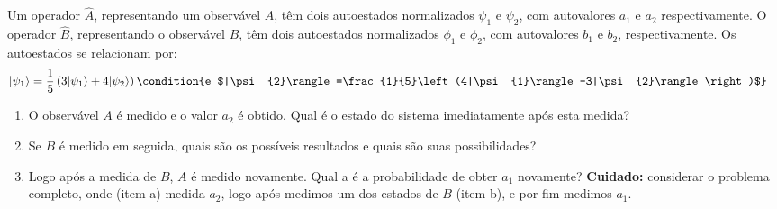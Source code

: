	\begin{prob}
		Um operador $\hat{A}$, representando um observável $A$, têm dois autoestados normalizados $\psi_{1}$ e $\psi_{2}$, com autovalores $a_{1}$ e $a_{2}$ respectivamente. O operador $\hat{B}$, representando o observável $B$, têm dois autoestados normalizados $\phi_{1}$ e $\phi_{2}$, com autovalores $b_{1}$ e $b_{2}$, respectivamente. Os autoestados se relacionam por:
		\begin{align}
			|\psi_{1}\rangle &= \frac{1}{5}\left(3|\psi_{1}\rangle+4|\psi_{2}\rangle\right)\condition{e $|\psi_{2}\rangle=\frac{1}{5}\left(4|\psi_{1}\rangle-3|\psi_{2}\rangle\right)$}  
		\end{align}
		\begin{enumerate}[label=\alph *)]
				\item O observável $A$ é medido e o valor $a_{2}$ é obtido. Qual é o estado do sistema imediatamente após esta medida?
				\item Se $B$ é medido em seguida, quais são os possíveis resultados e quais são suas possibilidades?
				\item Logo após a medida de $B$, $A$ é medido novamente. Qual a  é a probabilidade de obter $a_{1}$ novamente? \textbf{Cuidado:} considerar o problema completo, onde (item a) medida $a_{2}$, logo após medimos um  dos estados de $B$ (item b), e por fim  medimos $a_{1}$.
		\end{enumerate}
	\end{prob}


